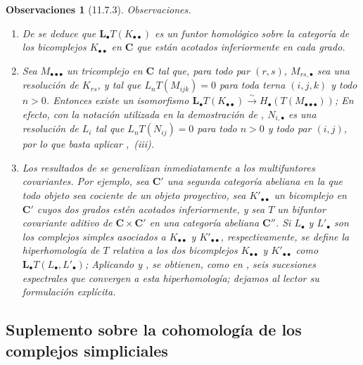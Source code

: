 \documentclass[10pt,oneside,openany]{book}
\theoremstyle{egaenv}\newtheorem*{env}{---}
\theoremstyle{egastatement}
\theoremstyle{egadescription}
\newtheorem*{remarks}{Observaciones}
\newcommand{\oldpage}[2][]{\marginnote{\normalfont\scriptsize\textbf{#1}\,|\,#2}\ignorespaces}
\begin{document}
\begin{remarks}[11.7.3]
\label{0.11.7.3}
\label{0.11.7.3-fr}
\emph{Observaciones}.
\begin{enumerate}
  \item[{\rm(i)}]
  De  se deduce que
  $\mathbf{L}_\bullet T(K_{\bullet\bullet})$ es un \emph{funtor homológico} sobre la
  categoría de los bicomplejos $K_{\bullet\bullet}$ en $\boldsymbol{C}$ que están
  acotados inferiormente en cada grado.

\oldpage[0\textsubscript{III}]{43}
  \item[{\rm(ii)}]
  Sea $M_{\bullet\bullet\bullet}$ un tricomplejo en $\boldsymbol{C}$ tal que,
  para todo par $(r,s)$, $M_{rs,\bullet}$ sea una \emph{resolución} de $K_{rs}$,
  y tal que
  $L_nT(M_{ijk})=0$
  para toda terna $(i,j,k)$ y todo $n>0$.
  Entonces existe un isomorfismo
  $
\mathbf{L}_\bullet T(K_{\bullet\bullet})
\xrightarrow{\sim} H_\bullet(T(M_{\bullet\bullet\bullet}))$;
  En efecto, con la notación utilizada en la demostración de ,
  $N_{i,\bullet}$ es una resolución de $L_i$ tal que
  $L_nT(N_{ij})=0$ para todo $n>0$ y todo par $(i,j)$, por lo que
  basta aplicar ,~(iii).

  \item[{\rm(iii)}]
  Los resultados de  se generalizan inmediatamente a los
  multifuntores covariantes.
  Por ejemplo, sea $\boldsymbol{C}'$ una segunda categoría abeliana en la que todo
  objeto sea cociente de un objeto proyectivo, sea
  $K'_{\bullet\bullet}$ un bicomplejo en $\boldsymbol{C}'$ cuyos dos grados estén
  acotados inferiormente, y sea $T$ un bifuntor covariante aditivo de
  $\boldsymbol{C}\times\boldsymbol{C}'$ en una categoría abeliana $\boldsymbol{C}''$.
  Si $L_\bullet$ y $L'_\bullet$ son los complejos simples asociados a
  $K_{\bullet\bullet}$ y $K'_{\bullet\bullet}$, respectivamente, se define
  la hiperhomología de $T$ relativa a los dos bicomplejos
  $K_{\bullet\bullet}$ y $K'_{\bullet\bullet}$ como
  $\mathbf{L}_\bullet T(L_\bullet,L'_\bullet)$;
  Aplicando  y , se obtienen, como en
  , seis sucesiones espectrales que convergen a esta hiperhomología;
  dejamos al lector su formulación explícita.
\end{enumerate}
\end{remarks}

\subsection{Suplemento sobre la cohomología de los complejos simpliciales}
\label{subsection:0.11.8}
\label{subsection:0.11.8-fr}
\end{document}

